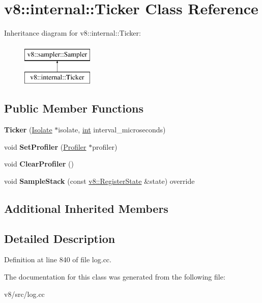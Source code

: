 \hypertarget{classv8_1_1internal_1_1Ticker}{}\section{v8\+:\+:internal\+:\+:Ticker Class Reference}
\label{classv8_1_1internal_1_1Ticker}
Inheritance diagram for v8\+:\+:internal\+:\+:Ticker\+:\begin{figure}[H]
\begin{center}
\leavevmode
\includegraphics[height=2.000000cm]{classv8_1_1internal_1_1Ticker}
\end{center}
\end{figure}
\subsection*{Public Member Functions}
\begin{DoxyCompactItemize}
\item 
\mbox{\label{classv8_1_1internal_1_1Ticker_add84fb7f671753917fba5b0a363428d2}} 
{\bfseries Ticker} (\mbox{\hyperlink{classv8_1_1internal_1_1Isolate}{Isolate}} $\ast$isolate, \mbox{\hyperlink{classint}{int}} interval\+\_\+microseconds)
\item 
\mbox{\label{classv8_1_1internal_1_1Ticker_a9bd275f6dca361cb4b1d7196967b4e0e}} 
void {\bfseries Set\+Profiler} (\mbox{\hyperlink{classv8_1_1internal_1_1Profiler}{Profiler}} $\ast$profiler)
\item 
\mbox{\label{classv8_1_1internal_1_1Ticker_adf0f145ffacc4b5030f921efc2089193}} 
void {\bfseries Clear\+Profiler} ()
\item 
\mbox{\label{classv8_1_1internal_1_1Ticker_a884cec6dd0fe06603514cfc9c183f7e4}} 
void {\bfseries Sample\+Stack} (const \mbox{\hyperlink{structv8_1_1RegisterState}{v8\+::\+Register\+State}} \&state) override
\end{DoxyCompactItemize}
\subsection*{Additional Inherited Members}


\subsection{Detailed Description}


Definition at line 840 of file log.\+cc.



The documentation for this class was generated from the following file\+:\begin{DoxyCompactItemize}
\item 
v8/src/log.\+cc\end{DoxyCompactItemize}
